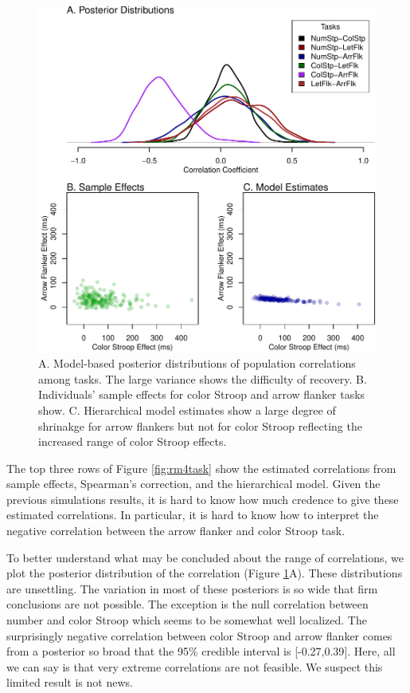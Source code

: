 \documentclass[
  english,
  ,man]{apa6}
\begin{document}
\begin{figure}
\centering
\includegraphics{p_files/figure-latex/rm4taskEst-1.pdf}
\caption{\label{fig:rm4taskEst}A. Model-based posterior distributions of population correlations among tasks. The large variance shows the difficulty of recovery. B. Individuals' sample effects for color Stroop and arrow flanker tasks show. C. Hierarchical model estimates show a large degree of shrinakge for arrow flankers but not for color Stroop reflecting the increased range of color Stroop effects.}
\end{figure}

The top three rows of Figure \ref{fig:rm4task} show the estimated correlations from sample effects, Spearman's correction, and the hierarchical model. Given the previous simulations results, it is hard to know how much credence to give these estimated correlations. In particular, it is hard to know how to interpret the negative correlation between the arrow flanker and color Stroop task.

To better understand what may be concluded about the range of correlations, we plot the posterior distribution of the correlation (Figure \ref{fig:rm4taskEst}A). These distributions are unsettling. The variation in most of these posteriors is so wide that firm conclusions are not possible. The exception is the null correlation between number and color Stroop which seems to be somewhat well localized. The surprisingly negative correlation between color Stroop and arrow flanker comes from a posterior so broad that the 95\% credible interval is {[}-0.27,0.39{]}. Here, all we can say is that very extreme correlations are not feasible. We suspect this limited result is not news.
\end{document}
